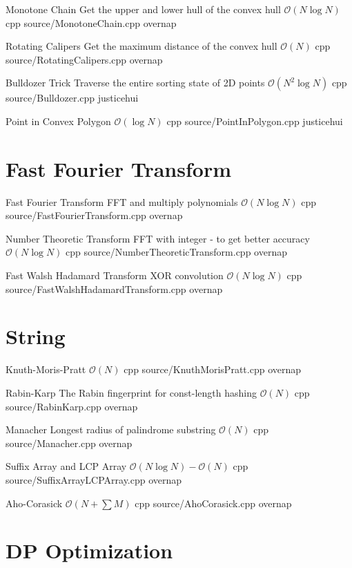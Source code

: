 \documentclass[landscape, 10pt, a4paper, oneside, twocolumn]{extarticle}
\begin{document}
\Algorithm
{Monotone Chain}
{Get the upper and lower hull of the convex hull}
{$\mathcal{O}(N\log{N})$}
{cpp}
{source/MonotoneChain.cpp}
{overnap}

\Algorithm
{Rotating Calipers}
{Get the maximum distance of the convex hull}
{$\mathcal{O}(N)$}
{cpp}
{source/RotatingCalipers.cpp}
{overnap}

\Algorithm
{Bulldozer Trick}
{Traverse the entire sorting state of 2D points}
{$\mathcal{O}(N^2\log{N})$}
{cpp}
{source/Bulldozer.cpp}
{justicehui}

\Algorithm
{Point in Convex Polygon}
{}
{$\mathcal{O}(\log{N})$}
{cpp}
{source/PointInPolygon.cpp}
{justicehui}


\section{Fast Fourier Transform}

\Algorithm
{Fast Fourier Transform}
{FFT and multiply polynomials}
{$\mathcal{O}(N\log{N})$}
{cpp}
{source/FastFourierTransform.cpp}
{overnap}

\Algorithm
{Number Theoretic Transform}
{FFT with integer - to get better accuracy}
{$\mathcal{O}(N\log{N})$}
{cpp}
{source/NumberTheoreticTransform.cpp}
{overnap}

\Algorithm
{Fast Walsh Hadamard Transform}
{XOR convolution}
{$\mathcal{O}(N\log{N})$}
{cpp}
{source/FastWalshHadamardTransform.cpp}
{overnap}


\section{String}

\Algorithm
{Knuth-Moris-Pratt}
{}
{$\mathcal{O}(N)$}
{cpp}
{source/KnuthMorisPratt.cpp}
{overnap}

\Algorithm
{Rabin-Karp}
{The Rabin fingerprint for const-length hashing}
{$\mathcal{O}(N)$}
{cpp}
{source/RabinKarp.cpp}
{overnap}

\Algorithm
{Manacher}
{Longest radius of palindrome substring}
{$\mathcal{O}(N)$}
{cpp}
{source/Manacher.cpp}
{overnap}

\Algorithm
{Suffix Array and LCP Array}
{}
{$\mathcal{O}(N\log{N})-\mathcal{O}(N)$}
{cpp}
{source/SuffixArrayLCPArray.cpp}
{overnap}

\Algorithm
{Aho-Corasick}
{}
{$\mathcal{O}(N+\sum{M})$}
{cpp}
{source/AhoCorasick.cpp}
{overnap}


\section{DP Optimization}
\end{document}
